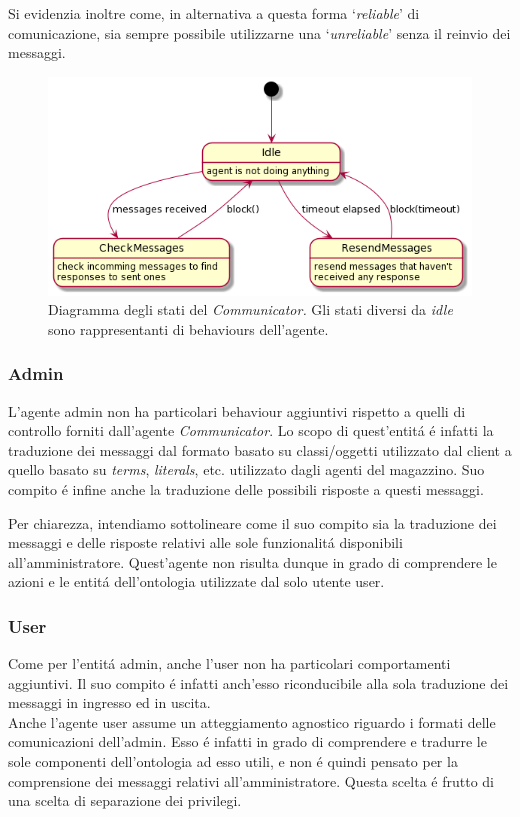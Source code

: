 Si evidenzia inoltre come, in alternativa a questa forma `\textit{reliable}' di comunicazione, sia sempre possibile utilizzarne una `\textit{unreliable}' senza il reinvio dei messaggi.
\begin{figure}[!ht]\centering
    \includegraphics[width=\textwidth]{section/design/figure/agent/communicator_states.png}
    \caption{Diagramma degli stati del \textit{Communicator.} Gli stati diversi da \textit{idle} sono rappresentanti di behaviours dell'agente.}
    \label{fig:communicator_state_diagrams}
\end{figure}

\subsubsection{Admin}
L'agente admin non ha particolari behaviour aggiuntivi rispetto a quelli di controllo forniti dall'agente \textit{Communicator}. Lo scopo di quest'entit\'a \'e infatti la traduzione dei messaggi dal formato basato su classi/oggetti utilizzato dal client a quello basato su \textit{terms}, \textit{literals}, etc. utilizzato dagli agenti del magazzino. Suo compito \'e infine anche la traduzione delle possibili risposte a questi messaggi.

Per chiarezza, intendiamo sottolineare come il suo compito sia la traduzione dei messaggi e delle risposte relativi alle sole funzionalit\'a disponibili all'amministratore. Quest'agente non risulta dunque in grado di comprendere le azioni e le entit\'a dell'ontologia utilizzate dal solo utente user.

\subsubsection{User}
Come per l'entit\'a admin, anche l'user non ha particolari comportamenti aggiuntivi. Il suo compito \'e infatti anch'esso riconducibile alla sola traduzione dei messaggi in ingresso ed in uscita.\\
Anche l'agente user assume un atteggiamento agnostico riguardo i formati delle comunicazioni dell'admin. Esso \'e infatti in grado di comprendere e tradurre le sole componenti dell'ontologia ad esso utili, e non \'e quindi pensato per la comprensione dei messaggi relativi all'amministratore. Questa scelta \'e frutto di una scelta di separazione dei privilegi.

